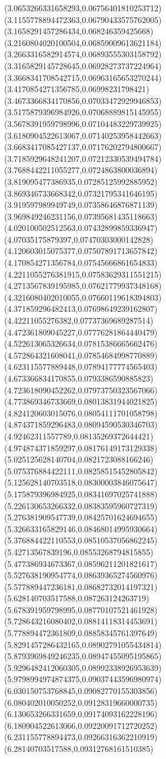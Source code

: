 {(3.0653266331658293,0.06756401810253712)
(3.1155778894472363,0.06790433575762005)
(3.1658291457286434,0.068246359425668)
(3.2160804020100504,0.06859009613621184)
(3.2663316582914574,0.06893555303158792)
(3.3165829145728645,0.06928273737224964)
(3.3668341708542715,0.06963165653270244)
(3.4170854271356785,0.06998231798421)
(3.4673366834170856,0.07033472929946853)
(3.5175879396984926,0.07068889815145955)
(3.5678391959798996,0.07104483229739925)
(3.6180904522613067,0.07140253958442663)
(3.6683417085427137,0.07176202794800667)
(3.7185929648241207,0.07212330539494784)
(3.7688442211055277,0.0724863800036894)
(3.819095477386935,0.07285125992885952)
(3.869346733668342,0.07321795341646195)
(3.919597989949749,0.07358646876871139)
(3.969849246231156,0.07395681435118663)
(4.020100502512563,0.07432899859336947)
(4.07035175879397,0.07470303000142828)
(4.120603015075377,0.07507891713657842)
(4.170854271356784,0.07545666861654833)
(4.2211055276381915,0.07583629311551215)
(4.2713567839195985,0.07621779937348168)
(4.3216080402010055,0.07660119618394803)
(4.371859296482413,0.07698649239162807)
(4.42211055276382,0.07737369689287514)
(4.472361809045227,0.07776281864440479)
(4.522613065326634,0.07815386665662476)
(4.572864321608041,0.07854684998770889)
(4.623115577889448,0.07894177774565403)
(4.673366834170855,0.0793386590885823)
(4.723618090452262,0.07973750323567066)
(4.773869346733669,0.08013831944021825)
(4.824120603015076,0.08054111701058798)
(4.874371859296483,0.08094590530346703)
(4.92462311557789,0.08135269372644421)
(4.974874371859297,0.08176149173129338)
(5.025125628140704,0.0821723088166246)
(5.075376884422111,0.08258515452805842)
(5.125628140703518,0.08300003846075647)
(5.175879396984925,0.08341697025741888)
(5.226130653266332,0.08383595960727319)
(5.276381909547739,0.08425701624694655)
(5.326633165829146,0.08468014995930664)
(5.376884422110553,0.08510537056862245)
(5.42713567839196,0.08553268794815855)
(5.477386934673367,0.08596211201821617)
(5.527638190954774,0.08639365274560976)
(5.577889447236181,0.08682732014197321)
(5.628140703517588,0.087263124263719)
(5.678391959798995,0.08770107521461928)
(5.728643216080402,0.08814118314453691)
(5.778894472361809,0.08858345761397649)
(5.8291457286432165,0.08902791055434814)
(5.8793969849246235,0.08947455095195865)
(5.9296482412060305,0.08992338926953639)
(5.9798994974874375,0.09037443596980974)
(6.030150753768845,0.09082770155303856)
(6.080402010050252,0.09128319660000735)
(6.130653266331659,0.09174093162228196)
(6.180904522613066,0.09220091712720252)
(6.231155778894473,0.09266316362210919)
(6.28140703517588,0.09312768161510385)
}
